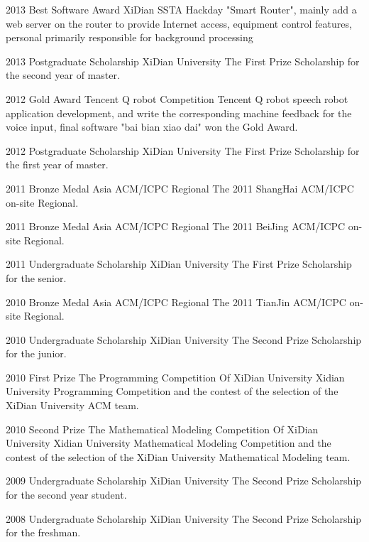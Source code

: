 \documentclass[]{friggeri-cv} %
\begin{document}
\begin{entrylist}

\entry
{2013}
{Best Software Award}
{XiDian SSTA Hackday}
{"Smart Router", mainly add a web server on the router to provide Internet access, equipment
control features, personal primarily responsible for background processing}

\entry
{2013}
{Postgraduate Scholarship}
{XiDian University}
{The First Prize Scholarship for the second year of master.}

\entry
{2012}
{Gold Award}
{Tencent Q robot Competition}
{Tencent Q robot speech robot application development, and write the corresponding machine
feedback for the voice input, final software "bai bian xiao dai" won the Gold Award.}

\entry
{2012}
{Postgraduate Scholarship}
{XiDian University}
{The First Prize Scholarship for the first year of master.}

\entry
{2011}
{Bronze Medal}
{Asia ACM/ICPC Regional}
{The 2011 ShangHai ACM/ICPC on-site Regional.}

\entry
{2011}
{Bronze Medal}
{Asia ACM/ICPC Regional}
{The 2011 BeiJing ACM/ICPC on-site Regional.}

\entry
{2011}
{Undergraduate Scholarship}
{XiDian University}
{The First Prize Scholarship for the senior.}

\entry
{2010}
{Bronze Medal}
{Asia ACM/ICPC Regional}
{The 2011 TianJin ACM/ICPC on-site Regional.}

\entry
{2010}
{Undergraduate Scholarship}
{XiDian University}
{The Second Prize Scholarship for the junior.}

\entry
{2010}
{First Prize}
{The Programming Competition Of XiDian University}
{Xidian University Programming Competition and the contest of the selection of the XiDian University ACM team.}

\entry
{2010}
{Second Prize}
{The  Mathematical Modeling Competition Of XiDian University}
{Xidian University Mathematical Modeling Competition and the contest of the selection of the XiDian University Mathematical Modeling team.}

\entry
{2009}
{Undergraduate Scholarship}
{XiDian University}
{The Second Prize Scholarship for the second year student.}

\entry
{2008}
{Undergraduate Scholarship}
{XiDian University}
{The Second Prize Scholarship for the freshman.}

\end{entrylist}

\end{document}
